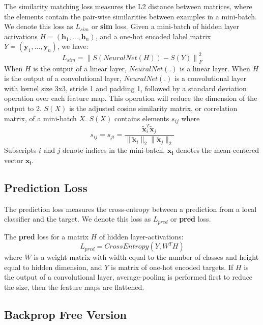 \documentclass{article}
\begin{document}
The similarity matching loss measures the L2 distance between matrices, where the elements contain the pair-wise similarities between examples in a mini-batch. We denote this loss as $L_{sim}$ or \textbf{sim} loss. Given a mini-batch of hidden layer activations $H=(\mathbf{h}_1,\ldots,\mathbf{h}_n)$, and a one-hot encoded label matrix $Y=(\mathbf{y}_1,\ldots,\mathbf{y}_n)$, we have:
\begin{equation}\label{eq:simloss}                                          
L_{sim} = \left \| S(NeuralNet(H)) - S(Y) \right \|^2_F
\end{equation}
When $H$ is the output of a linear layer, $NeuralNet(.)$ is a linear layer. When $H$ is the output of a convolutional layer, $NeuralNet(.)$ is a convolutional layer with kernel size 3x3, stride 1 and padding 1, followed by a standard deviation operation over each feature map. This operation will reduce the dimension of the output to 2. $S(X)$ is the adjusted cosine similarity matrix, or correlation matrix, of a mini-batch $X$. $S(X)$ contains elements $s_{ij}$ where 
\begin{equation} 
s_{ij} = s_{ji} = \frac{\mathbf{\widetilde{x}}_i^T\mathbf{\widetilde{x}}_j} {\|\mathbf{\widetilde{x}}_i\|_{2} \|\mathbf{\widetilde{x}}_j\|_{2}}
\end{equation}
Subscripts $i$ and $j$ denote indices in the mini-batch. $\mathbf{\widetilde{x}_i}$ denotes the mean-centered vector $\mathbf{x_i}$.

\subsection{Prediction Loss}

The prediction loss measures the cross-entropy between a prediction from a local classifier and the target. We denote this loss as $L_{pred}$ or \textbf{pred} loss.

The \textbf{pred} loss for a matrix $H$ of hidden layer-activations:
\begin{equation} 
L_{pred} = CrossEntropy(Y, W^TH)
\end{equation} 
where $W$ is a weight matrix with width equal to the number of classes and height equal to hidden dimension, and $Y$ is matrix of one-hot encoded targets. If $H$ is the output of a convolutional layer, average-pooling is performed first to reduce the size, then the feature maps are flattened.

\subsection{Backprop Free Version}
\end{document}
